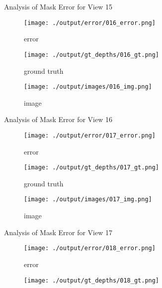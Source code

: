 \documentclass{article}
\begin{document}
\begin{figure}
	\hfill
	\caption{Analysis of Mask Error for View 15}
	\label{fig:error_analys15}
\end{figure}\begin{figure}
	\centering
	\begin{subfigure}{0.3\textwidth}
		\centering
		\texttt{[image: ./output/error/016\_error.png]}
		\caption{error}
		\label{fig:error16}
	\end{subfigure}
	\hfill
	\centering
	\begin{subfigure}{0.3\textwidth}
		\centering
		\texttt{[image: ./output/gt\_depths/016\_gt.png]}
		\caption{ground truth}
		\label{fig:gt16}
	\end{subfigure}
	\hfill
	\centering
	\begin{subfigure}{0.3\textwidth}
		\centering
		\texttt{[image: ./output/images/016\_img.png]}
		\caption{image}
		\label{fig:img16}
	\end{subfigure}
	\hfill
	\caption{Analysis of Mask Error for View 16}
	\label{fig:error_analys16}
\end{figure}\begin{figure}
	\centering
	\begin{subfigure}{0.3\textwidth}
		\centering
		\texttt{[image: ./output/error/017\_error.png]}
		\caption{error}
		\label{fig:error17}
	\end{subfigure}
	\hfill
	\centering
	\begin{subfigure}{0.3\textwidth}
		\centering
		\texttt{[image: ./output/gt\_depths/017\_gt.png]}
		\caption{ground truth}
		\label{fig:gt17}
	\end{subfigure}
	\hfill
	\centering
	\begin{subfigure}{0.3\textwidth}
		\centering
		\texttt{[image: ./output/images/017\_img.png]}
		\caption{image}
		\label{fig:img17}
	\end{subfigure}
	\hfill
	\caption{Analysis of Mask Error for View 17}
	\label{fig:error_analys17}
\end{figure}\begin{figure}
	\centering
	\begin{subfigure}{0.3\textwidth}
		\centering
		\texttt{[image: ./output/error/018\_error.png]}
		\caption{error}
		\label{fig:error18}
	\end{subfigure}
	\hfill
	\centering
	\begin{subfigure}{0.3\textwidth}
		\centering
		\texttt{[image: ./output/gt\_depths/018\_gt.png]}

\end{subfigure}
\end{figure}
\end{document}

